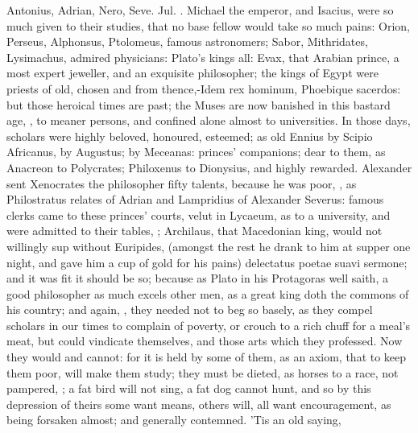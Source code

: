 {Antonius, Adrian, Nero, Seve. Jul. \etc{}. Michael the emperor,
and Isacius, were so much given to their studies, that no base fellow
would take so much pains: Orion, Perseus, Alphonsus, Ptolomeus, famous
astronomers; Sabor, Mithridates, Lysimachus, admired physicians:
Plato's kings all: Evax, that Arabian prince, a most expert jeweller,
and an exquisite philosopher; the kings of Egypt were priests of old,
chosen and from thence,-Idem rex hominum, Phoebique sacerdos: but those
heroical times are past; the Muses are now banished in this bastard
age, , to meaner persons, and confined alone almost
to universities. In those days, scholars were highly beloved,
honoured, esteemed; as old Ennius by Scipio Africanus, \Virgil{} by
Augustus; \Horace{} by Meceanas: princes' companions; dear to them, as
Anacreon to Polycrates; Philoxenus to Dionysius, and highly rewarded.
Alexander sent Xenocrates the philosopher fifty talents, because he was
poor, , as Philostratus relates of Adrian and Lampridius of Alexander
Severus: famous clerks came to these princes' courts, velut in Lycaeum,
as to a university, and were admitted to their tables, ; Archilaus, that Macedonian king, would not
willingly sup without Euripides, (amongst the rest he drank to him at
supper one night, and gave him a cup of gold for his pains) delectatus
poetae suavi sermone; and it was fit it should be so; because as
Plato in his Protagoras well saith, a good philosopher as much
excels other men, as a great king doth the commons of his country; and
again, , they
needed not to beg so basely, as they compel scholars in our times
to complain of poverty, or crouch to a rich chuff for a meal's meat,
but could vindicate themselves, and those arts which they professed.
Now they would and cannot: for it is held by some of them, as an axiom,
that to keep them poor, will make them study; they must be dieted, as
horses to a race, not pampered, ; a fat bird will not sing, a
fat dog cannot hunt, and so by this depression of theirs some
want means, others will, all want encouragement, as being
forsaken almost; and generally contemned. 'Tis an old saying, }
